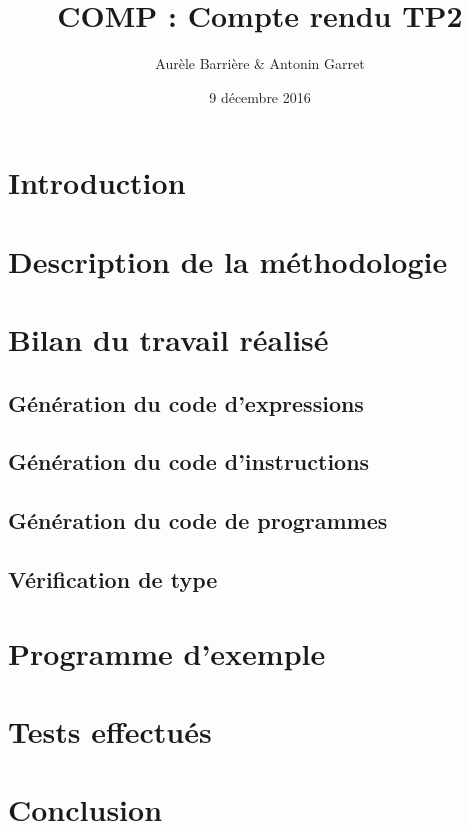 \documentclass{article}
\title{COMP : Compte rendu TP2}
\author{Aurèle Barrière \& Antonin Garret}
\date{9 décembre 2016}
\begin{document}
\maketitle

\section{Introduction}

\section{Description de la méthodologie}

\section{Bilan du travail réalisé}
  \subsection{Génération du code d'expressions}

  \subsection{Génération du code d'instructions}

  \subsection{Génération du code de programmes}

  \subsection{Vérification de type}

\section{Programme d'exemple}


\section{Tests effectués}

\section{Conclusion}
\end{document}
